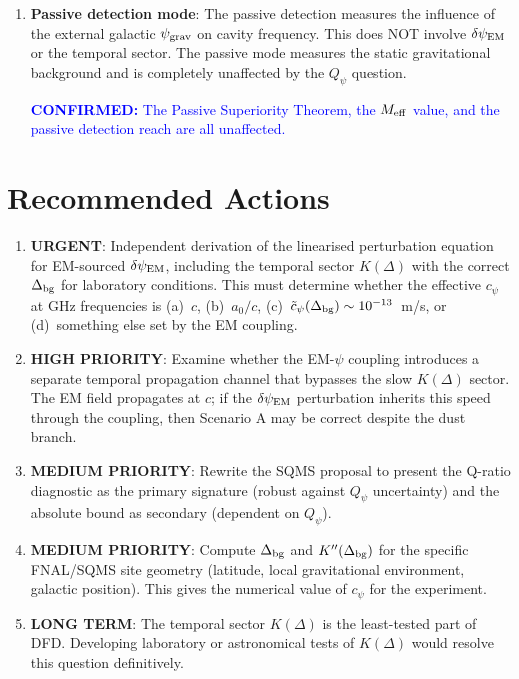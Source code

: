 \documentclass[11pt]{article}
\newcommand{\Qpsi}{Q_\psi}
\newcommand{\dpsiEM}{\delta\psi_{\rm EM}}
\newcommand{\confirmed}[1]{\textcolor{blue}{\textbf{CONFIRMED:} #1}}
\theoremstyle{definition}
\theoremstyle{remark}
\begin{document}
\begin{tcolorbox}[colback=yellow!5!white, colframe=orange!60!black,
  title=\textbf{IMPACT ASSESSMENT}]
\begin{enumerate}
\item \textbf{Passive detection mode}: The passive detection measures
  the influence of the external galactic $\psi_{\rm grav}$ on cavity
  frequency. This does NOT involve $\dpsiEM$ or the temporal sector.
  The passive mode measures the static gravitational background and
  is completely unaffected by the $\Qpsi$ question.

  \confirmed{The Passive Superiority Theorem, the $M_{\rm eff}$ value,
  and the passive detection reach are all unaffected.}
\end{enumerate}
\end{tcolorbox}


\section{Recommended Actions}
\label{sec:actions}

\begin{enumerate}
\item \textbf{URGENT}: Independent derivation of the linearised
  perturbation equation for EM-sourced $\dpsiEM$, including the
  temporal sector $K(\Delta)$ with the correct $\Delta_{\rm bg}$
  for laboratory conditions. This must determine whether the
  effective $c_\psi$ at GHz frequencies is (a)~$c$, (b)~$a_0/c$,
  (c)~$\tilde{c}_\psi(\Delta_{\rm bg}) \sim 10^{-13}$~m/s, or
  (d)~something else set by the EM coupling.

\item \textbf{HIGH PRIORITY}: Examine whether the EM-$\psi$ coupling
  introduces a separate temporal propagation channel that bypasses
  the slow $K(\Delta)$ sector. The EM field propagates at $c$; if
  the $\dpsiEM$ perturbation inherits this speed through the coupling,
  then Scenario A may be correct despite the dust branch.

\item \textbf{MEDIUM PRIORITY}: Rewrite the SQMS proposal to present
  the Q-ratio diagnostic as the primary signature (robust against
  $\Qpsi$ uncertainty) and the absolute bound as secondary (dependent
  on $\Qpsi$).

\item \textbf{MEDIUM PRIORITY}: Compute $\Delta_{\rm bg}$ and
  $K''(\Delta_{\rm bg})$ for the specific FNAL/SQMS site geometry
  (latitude, local gravitational environment, galactic position).
  This gives the numerical value of $c_\psi$ for the experiment.

\item \textbf{LONG TERM}: The temporal sector $K(\Delta)$ is the
  least-tested part of DFD. Developing laboratory or astronomical
  tests of $K(\Delta)$ would resolve this question definitively.
\end{enumerate}
\end{document}
